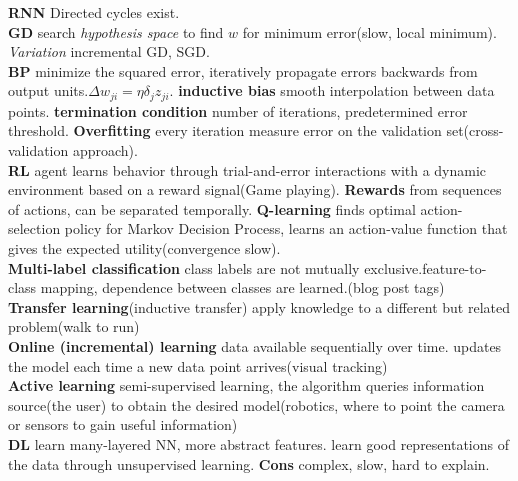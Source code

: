 \documentclass[cheatsheet.tex]{subfiles}
\begin{document}
\textbf{RNN} Directed cycles exist.\\

\textbf{GD} search \textit{hypothesis space} to find $w$ for minimum error(slow, local minimum). \textit{Variation} incremental GD, SGD.\\

\textbf{BP} minimize the squared error, iteratively propagate errors backwards from output units.$\Delta w_{ji}=\eta \delta_jz_{ji}$. \textbf{inductive bias}  smooth interpolation between data points. \textbf{termination condition} number of iterations, predetermined error threshold. \textbf{Overfitting} every iteration measure error on the validation set(cross-validation approach).\\

\textbf{RL} agent learns behavior through trial-and-error interactions with a dynamic environment based on a reward signal(Game playing). \textbf{Rewards} from sequences of actions, can be separated temporally. \textbf{Q-learning} finds optimal action-selection policy for Markov Decision Process, learns an action-value function that gives the expected utility(convergence slow).\\

\textbf{Multi-label classification} class labels are not mutually exclusive.feature-to-class mapping, dependence between classes are learned.(blog post tags)\\

\textbf{Transfer learning}(inductive transfer) apply knowledge to a different but related problem(walk to run)\\

\textbf{Online (incremental) learning} data available sequentially over time. updates the model each time a new data point arrives(visual tracking)\\

\textbf{Active learning} semi-supervised learning, the algorithm queries information source(the user) to obtain the desired model(robotics, where to point the camera or sensors to gain useful information)\\

\textbf{DL} learn many-layered NN, more abstract features. learn good representations of the data through unsupervised learning. \textbf{Cons} complex, slow, hard to explain.
\end{document}
